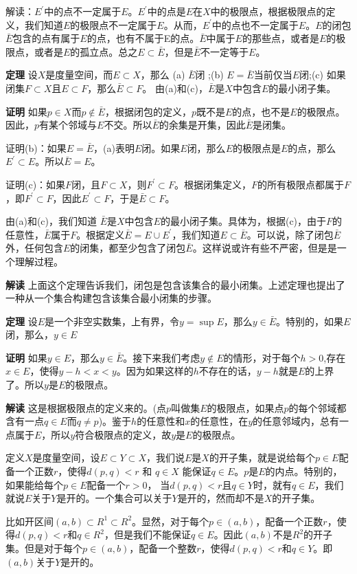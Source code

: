 \documentclass[10pt,a4paper,UTF8]{article}
\begin{document}
解读：\(E^{'}\)中的点不一定属于\(E\)。\(E^{'}\)中的点是\(E\)在\(X\)中的极限点，根据极限点的定义，我们知道\(E\)的极限点不一定属于\(E\)。从而，\(E^{'}\)中的点也不一定属于\(E\)。\(E\)的闭包\(\bar{E}\)包含的点有属于\(E\)的点，也有不属于E的点。\(\bar{E}\)中属于\(E\)的那些点，或者是\(E\)的极限点，或者是\(E\)的孤立点。总之\(E\subset \bar{E}\)，但是\(\bar{E}\)不一定等于\(E\)。

\textbf{定理} 设\(X\)是度量空间，而\(E\subset X\)，那么 (a) \(\bar{E}闭\) ;(b) \(E=\bar{E}\)当前仅当\(E\)闭;(c) 如果闭集\(F\subset X\)且\(E\subset F\)，那么\(\bar{E}\subset F\)。 由(a)和(c)，\(\bar{E}\)是\(X\)中包含\(E\)的最小闭子集。

\textbf{证明} 如果\(p\in X\)而\(p\notin \bar{E}\)，根据闭包的定义，\(p\)既不是\(E\)的点，也不是\(E\)的极限点。因此，\(p\)有某个邻域与\(E\)不交。所以\(\bar{E}\)的余集是开集，因此\(\bar{E}\)是闭集。

证明(b)：如果\(E=\bar{E}\)，(a)表明\(E\)闭。如果\(E\)闭，那么\(E\)的极限点是\(E\)的点，那么\(E^{'}\subset E\)。所以\(\bar{E} = E\)。

证明(c)：如果\(F\)闭，且\(F\subset X\)，则\(F^{'}\subset F\)。根据闭集定义，\(F\)的所有极限点都属于\(F\)，即\(F^{'}\subset F\)，因此\(E^{'}\subset F\)，于是\(\bar{E}\subset F\)。

由(a)和(c)，我们知道 \(\bar{E}\)是\(X\)中包含\(E\)的最小闭子集。具体为，根据(c)，由于\(F\)的任意性，\(\bar{E}\)属于\(F\)。根据定义\(\bar{E} = E\cup E^{'}\)，我们知道\(E\subset \bar{E}\)。可以说，除了闭包\(\bar{E}\)外，任何包含\(E\)的闭集，都至少包含了闭包\(\bar{E}\)。这样说或许有些不严密，但是是一个理解过程。

\textbf{解读} 上面这个定理告诉我们，闭包是包含该集合的最小闭集。上述定理也提出了一种从一个集合构建包含该集合最小闭集的步骤。

\textbf{定理} 设\(E\)是一个非空实数集，上有界，令\(y=\sup E\)，那么\(y\in \bar{E}\)。特别的，如果\(E\)闭，那么，\(y\in E\)

\textbf{证明} 如果\(y\in E\)，那么\(y\in \bar{E}\)。接下来我们考虑\(y\notin E\)的情形，对于每个\(h>0\),存在\(x\in E\)，使得\(y-h < x < y\)。因为如果这样的\(h\)不存在的话，\(y-h\)就是\(E\)的上界了。所以\(y\)是\(E\)的极限点。

\textbf{解读} 这是根据极限点的定义来的。(点\(p\)叫做集\(E\)的极限点，如果点\(p\)的每个邻域都含有一点\(q\in E\)而\(q\neq p\))。鉴于\(h\)的任意性和\(x\)的任意性，在\(y\)的任意邻域内，总有一点属于\(E\)，所以\(y\)符合极限点的定义，故\(y\)是\(E\)的极限点。

定义\(X\)是度量空间，设\(E\subset Y\subset X\)，我们说\(E\)是\(X\)的开子集，就是说给每个\(p\in E\)配备一个正数\(r\)，使得\(d(p,q) < r\) 和 \(q\in X\) 能保证\(q\in E\)。\(p\)是\(E\)的内点。特别的，如果能给每个\(p\in E\)配备一个\(r > 0\)， 当\(d(p,q) < r\)且\(q\in Y\)时，就有\(q\in E\)，我们就说\(E\)关于\(Y\)是开的。一个集合可以关于\(Y\)是开的，然而却不是\(X\)的开子集。

比如开区间\((a,b)\subset R^{1} \subset {R^{2}}\)。显然，对于每个\(p\in (a,b)\)，配备一个正数\(r\)，使得\(d(p,q) < r\)和\(q\in R^{2}\)，但是我们不能保证\(q\in E\)。因此\((a,b)\)不是\(R^{2}\)的开子集。但是对于每个\(p\in (a,b)\)，配备一个整数\(r\)，使得\(d(p,q) < r\)和\(q\in Y\)。即\((a,b)\)关于\(Y\)是开的。
\end{document}
